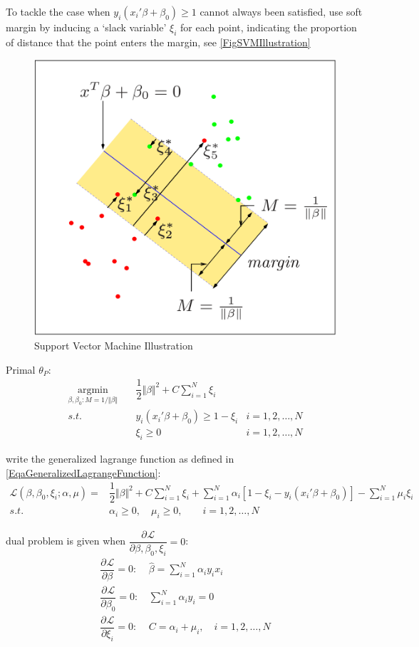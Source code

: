     To tackle the case when $ y_i(x_i'\beta +\beta _0)\geq 1 $ cannot always been satisfied, use soft margin by inducing a `slack variable' $ \xi _i $ for each point, indicating the proportion of distance that the point enters the margin, see \autoref{FigSVMIllustration}

\begin{figure}[H]
    \centering
    \includegraphics[width=0.4\linewidth]{sections/images/SVM.png}
    \caption{Support Vector Machine Illustration}
    \label{FigSVMIllustration}
\end{figure}

    Primal $ \theta _P $:
    \begin{equation*}
        \begin{aligned}
        \mathop{\arg\min}\limits_{\beta ,\beta _0:M=1/\Vert \beta  \Vert }\quad &\dfrac{1}{2}\Vert \beta  \Vert^2+C\sum_{i=1}^N\xi _i \\
        s.t.\quad & y_i(x_i'\beta +\beta _0)\geq 1-\xi _i&i=1,2,\ldots,N\\
        &\xi _i\geq 0&i=1,2,\ldots,N
        \end{aligned}
    \end{equation*}

    write the generalized lagrange function as defined in \autoref{EqaGeneralizedLagrangeFunction}:
\begin{align}
    \mathcal{L}(\beta ,\beta _0,\xi _i;\alpha ,\mu )=&\dfrac{1}{2}\Vert \beta  \Vert ^2+C\sum_{i=1}^N\xi _i+\sum_{i=1}^N\alpha _i\left[1-\xi _i-y_i(x_i'\beta +\beta _0)\right]-\sum_{i=1}^N\mu _i\xi _i \\
    s.t.\quad & \alpha _i\geq 0,\quad \mu _i\geq 0,\qquad i=1,2,\ldots,N
\end{align}
        
    dual problem is given when $ \dfrac{\partial^{} \mathcal{L}}{\partial \beta ,\beta _0,\xi _i^{}}=0 $:
\begin{align}
    \dfrac{\partial^{} \mathcal{L}}{\partial \beta ^{}}=0:\,&\hat{\beta }=\sum_{i=1}^N\alpha _iy_ix_i\\
    \dfrac{\partial^{} \mathcal{L}}{\partial \beta _0^{}}=0:\,&\sum_{i=1}^N\alpha _iy_i=0\\
    \dfrac{\partial^{} \mathcal{L}}{\partial \xi _i^{}}=0:\,&C=\alpha _i+\mu _i,\quad i=1,2,\ldots,N
\end{align}

